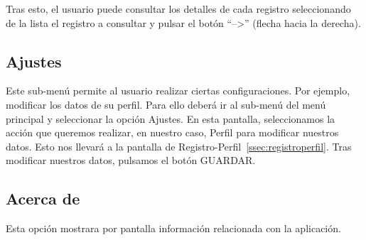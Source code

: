 Tras esto, el usuario puede consultar los detalles de cada registro seleccionando de la lista el registro a consultar y pulsar el botón ``-->'' (flecha hacia la derecha).

\subsection{Ajustes}
Este sub-menú permite al usuario realizar ciertas configuraciones. Por ejemplo, modificar los datos de su perfil. Para ello deberá ir al sub-menú del menú principal y seleccionar la opción Ajustes. En esta pantalla, seleccionamos la acción que queremos realizar, en nuestro caso, Perfil para modificar nuestros datos. Esto nos llevará a la pantalla de Registro-Perfil~\ref{ssec:registroperfil}. Tras modificar nuestros datos, pulsamos el botón GUARDAR.
\subsection{Acerca de}
Esta opción mostrara por pantalla información relacionada con la aplicación.
